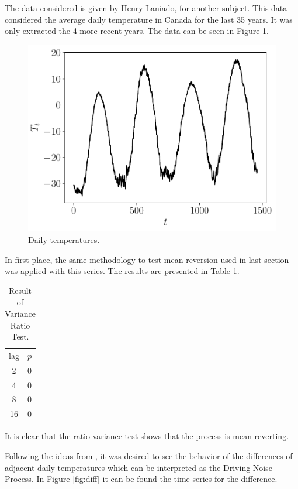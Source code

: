 \documentclass[11pt]{article}
\theoremstyle{definition}
\theoremstyle{remark}
\theoremstyle{remark}
\begin{document}
The data considered is given by Henry Laniado, for another
subject. This data considered the average daily temperature in Canada
for the last 35 years. It was only extracted the 4 more recent years.
The data can be seen in Figure \ref{fig:series3}.

\begin{figure}
  \centering
  \includegraphics[scale=0.5]{temps.pdf}
  \caption{Daily temperatures.}
  \label{fig:series3}
\end{figure}

In first place, the same methodology to test mean reversion used in
last section was applied with this series. The results are presented
in Table \ref{tab:lags3}.

\begin{table}[H]
  \centering
  \begin{tabular}{cc}
    \hline
    lag & $p$   \\
    2   & 0 \\
    4   & 0     \\
    8   & 0     \\
    16  & 0 \\ \hline
  \end{tabular}
  \caption{Result of Variance Ratio Test.}
  \label{tab:lags3}
\end{table}

It is clear that the ratio variance test shows that the process is
mean reverting.

Following the ideas from \parencite{alaton2002}, it was desired to see
the behavior of the differences of adjacent daily temperatures which
can be interpreted as the Driving Noise Process. In Figure
\ref{fig:diff} it can be found the time series for the difference.
\end{document}

